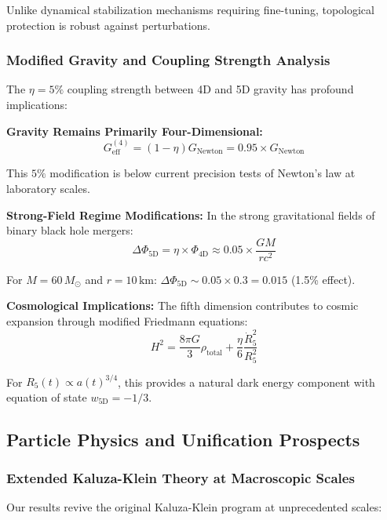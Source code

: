 \documentclass[reprint,amsmath,amssymb,aps,prd]{revtex4-2}
\newcommand{\Msun}{\,M_{\odot}}
\newcommand{\km}{\,\text{km}}
\begin{document}
Unlike dynamical stabilization mechanisms requiring fine-tuning, topological protection is robust against perturbations.

\subsubsection{Modified Gravity and Coupling Strength Analysis}

The $\eta = 5\%$ coupling strength between 4D and 5D gravity has profound implications:

\textbf{Gravity Remains Primarily Four-Dimensional:}
\begin{equation}
G_{\text{eff}}^{(4)} = (1 - \eta) G_{\text{Newton}} = 0.95 \times G_{\text{Newton}}
\end{equation}

This $5\%$ modification is below current precision tests of Newton's law at laboratory scales.

\textbf{Strong-Field Regime Modifications:}
In the strong gravitational fields of binary black hole mergers:
\begin{equation}
\Delta \Phi_{\text{5D}} = \eta \times \Phi_{\text{4D}} \approx 0.05 \times \frac{GM}{rc^2}
\end{equation}

For $M = 60\Msun$ and $r = 10\km$: $\Delta \Phi_{\text{5D}} \sim 0.05 \times 0.3 = 0.015$ (1.5\% effect).

\textbf{Cosmological Implications:}
The fifth dimension contributes to cosmic expansion through modified Friedmann equations:
\begin{equation}
H^2 = \frac{8\pi G}{3}\rho_{\text{total}} + \frac{\eta}{6}\frac{\dot{R}_5^2}{R_5^2}
\end{equation}

For $R_5(t) \propto a(t)^{3/4}$, this provides a natural dark energy component with equation of state $w_{\text{5D}} = -1/3$.

\subsection{Particle Physics and Unification Prospects}

\subsubsection{Extended Kaluza-Klein Theory at Macroscopic Scales}

Our results revive the original Kaluza-Klein program at unprecedented scales:
\end{document}
